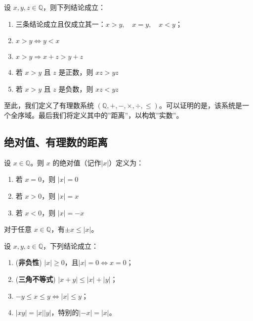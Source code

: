 \begin{theorem}[序的基本性质]
	设 $x,y,z\in \mathbb Q$，则下列结论成立：
	\begin{enumerate}
		\item 三条结论成立且仅成立其一：$x> y, \quad x=y,\quad x < y$；
		\item $x>y\iff y < x$
		\item $x>y \Rightarrow x+z > y+z$
		\item 若 $x > y$ 且 $z$ 是正数，则 $xz > yz$
		\item 若 $x > y$ 且 $z$ 是负数，则 $xz < yz$
	\end{enumerate}
\end{theorem}

至此，我们定义了有理数系统 $(\mathbb Q, +, -, \times , \div, \le)$。可以证明的是，该系统是一个全序域。最后我们将定义其中的''距离''，以构筑''实数''。

\subsection{绝对值、有理数的距离}

\begin{definition}
	设 $x\in \mathbb Q$。则 $x$ 的绝对值（记作$|x|$）定义为：
	\begin{enumerate}
		\item 若 $x=0$，则 $|x|=0$
		\item 若 $x > 0$，则 $|x|=x$
		\item 若 $x < 0$，则 $|x|=-x$
	\end{enumerate}
\end{definition}

\begin{corollary}
	对于任意 $x\in \mathbb Q$，有$\pm x \le |x|$。
\end{corollary}

\begin{theorem}[绝对值的基本性质]
	设 $x,y,z\in \mathbb Q$，下列结论成立：
	\begin{enumerate}
		\item (\textbf{非负性}) $|x| \ge 0$，且$|x|=0\iff x=0$；
		\item (\textbf{三角不等式}) $|x+y|\le |x| + |y|$；
		\item $-y \le x \le y \iff |x| \le y$；
		\item $|xy| = |x| |y|$，特别的$|-x| = |x|$。
	\end{enumerate}
\end{theorem}

